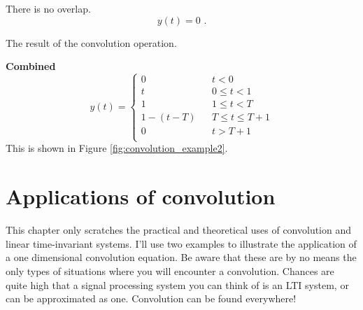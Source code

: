 There is no overlap.
\begin{equation}
y(t) = 0\,\,.
\end{equation}

\begin{marginfigure}
\begin{center}
\end{center}
\caption{The result of the convolution operation.}
\label{fig:convolution_example2}
\end{marginfigure}

\noindent \textbf{Combined}
\begin{equation*}
y(t) = \left\{ \begin{array}{lcc}
    0 & & t<0  \\
    t & & 0 \le t < 1\\
    1 & & 1 \le t < T\\
    1-(t-T) & & T \le t \le T+1\\
    0 & & t > T+1\\
\end{array}
\right.
\end{equation*}
This is shown in Figure \ref{fig:convolution_example2}.

\section{Applications of convolution}

This chapter only scratches the practical and theoretical uses of
convolution and linear time-invariant systems. I'll use two examples
to illustrate the application of a one dimensional convolution
equation. Be aware that these are by no means the only types of
situations where you will encounter a convolution. Chances are quite
high that a signal processing system you can think of is an LTI
system, or can be approximated as one. Convolution can be found
everywhere!


